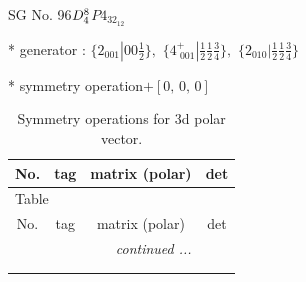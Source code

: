 \documentclass[fleqn,8pt]{jsarticle}
\begin{document}
\setcounter{MaxMatrixCols}{32}

\renewcommand{\tablename}{Table~}
\renewcommand{\figurename}{Figure~}
\begin{center}
\LARGE
SG No. 96\quad$D_{\rm 4}^{8}$\quad$P4_32_12$\quad[ tetragonal ]
\end{center}

* generator : $\{2{}_{001}|0 0 \frac{1}{2}\},\,\,\{4^{+}_{\,\,001}|\frac{1}{2} \frac{1}{2} \frac{3}{4}\},\,\,\{2{}_{010}|\frac{1}{2} \frac{1}{2} \frac{3}{4}\}$

* symmetry operation\quad$+\left[ 0,\, 0,\, 0 \right]$
\renewcommand{\arraystretch}{1.3}
\begin{longtable}{cccc}
\caption{Symmetry operations for 3d polar vector.}
 \\
 \hline \hline
No. & tag & matrix (polar) & det \\ \hline \endfirsthead

\multicolumn{3}{l}{\tablename\ \thetable{}} \\
 \hline \hline
No. & tag & matrix (polar) & det \\ \hline \endhead

 \hline \hline
\multicolumn{3}{r}{\footnotesize\it continued ...} \\ \endfoot

 \hline \hline
\multicolumn{3}{r}{} \\ \endlastfoot


\end{longtable}
\end{document}
